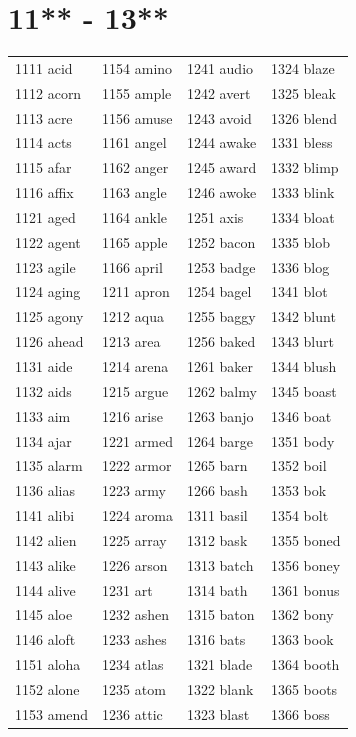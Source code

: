 \documentclass[12pt, oneside]{book}
\begin{document}
	\begin{table}[h]
		\centering
		\section*{11** - 13**}
		\begin{tabular}{l l l l}
			1111 acid & 1154 amino & 1241 audio & 1324 blaze\\
			1112 acorn & 1155 ample & 1242 avert & 1325 bleak\\
			1113 acre & 1156 amuse & 1243 avoid & 1326 blend\\
			1114 acts & 1161 angel & 1244 awake & 1331 bless\\
			1115 afar & 1162 anger & 1245 award & 1332 blimp\\
			1116 affix & 1163 angle & 1246 awoke & 1333 blink\\
			1121 aged & 1164 ankle & 1251 axis & 1334 bloat\\
			1122 agent & 1165 apple & 1252 bacon & 1335 blob\\
			1123 agile & 1166 april & 1253 badge & 1336 blog\\
			1124 aging & 1211 apron & 1254 bagel & 1341 blot\\
			1125 agony & 1212 aqua & 1255 baggy & 1342 blunt\\
			1126 ahead & 1213 area & 1256 baked & 1343 blurt\\
			1131 aide & 1214 arena & 1261 baker & 1344 blush\\
			1132 aids & 1215 argue & 1262 balmy & 1345 boast\\
			1133 aim  & 1216 arise & 1263 banjo & 1346 boat\\
			1134 ajar & 1221 armed & 1264 barge & 1351 body\\
			1135 alarm & 1222 armor & 1265 barn & 1352 boil\\
			1136 alias & 1223 army & 1266 bash & 1353 bok\\
			1141 alibi & 1224 aroma & 1311 basil & 1354 bolt\\
			1142 alien & 1225 array & 1312 bask & 1355 boned\\
			1143 alike & 1226 arson & 1313 batch & 1356 boney\\
			1144 alive & 1231 art  & 1314 bath & 1361 bonus\\
			1145 aloe & 1232 ashen & 1315 baton & 1362 bony\\
			1146 aloft & 1233 ashes & 1316 bats & 1363 book\\
			1151 aloha & 1234 atlas & 1321 blade & 1364 booth\\
			1152 alone & 1235 atom & 1322 blank & 1365 boots\\
			1153 amend & 1236 attic & 1323 blast & 1366 boss\\
		\end{tabular}
	\end{table}
	
\end{document}
